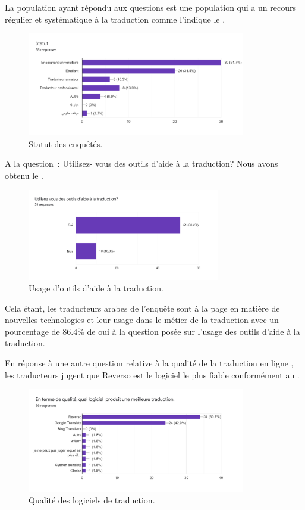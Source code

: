 \documentclass[french,english,brazil]{textolivre}
\begin{document}
La population ayant répondu aux questions est une population qui a un recours régulier et systématique à la traduction comme l’indique le .

\begin{figure}[htbp]
 \centering
 \includegraphics[width=0.85\textwidth]{figure02.png}
 \caption{Statut des enquêtés.}
 \label{fig-02}
\end{figure}

A la question : Utilisez- vous des outils d’aide à la traduction? Nous avons obtenu le .

\begin{figure}[htbp]
 \centering
 \includegraphics[width=0.75\textwidth]{figure03.png}
 \caption{Usage d’outils d’aide à la traduction.}
 \label{fig-03}
\end{figure}

Cela étant, les traducteurs arabes de l’enquête sont à la page en matière de nouvelles technologies et leur usage dans le métier de la traduction avec un pourcentage de 86.4\% de oui à la question posée sur l’usage des outils d’aide à la traduction.

En réponse à une autre question relative à la qualité de la traduction en ligne , les traducteurs jugent que Reverso est le logiciel le plus fiable conformément au . 

\begin{figure}[htbp]
 \centering
 \includegraphics[width=0.85\textwidth]{figure04.png}
 \caption{Qualité des logiciels de traduction.}
 \label{fig-04}
\end{figure}
\end{document}

